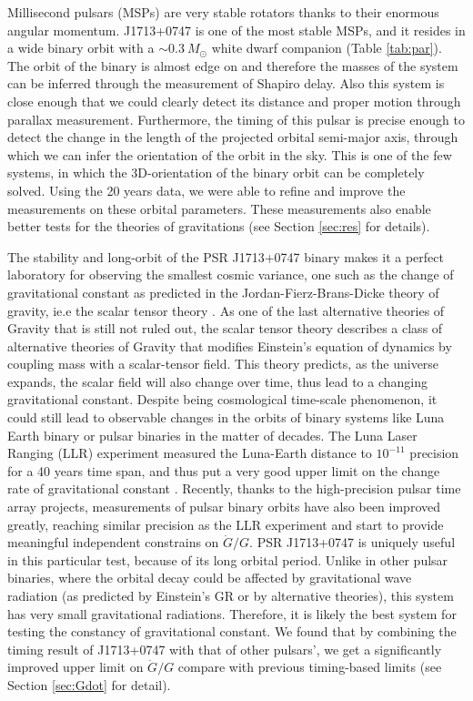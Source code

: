 Millisecond pulsars (MSPs) are very stable rotators thanks to their enormous angular momentum. J1713+0747 is one of
the most stable MSPs, and it resides in a wide binary orbit
with a $\sim0.3~M_{\odot}$ white dwarf companion (Table \ref{tab:par}). 
The orbit of the binary is almost edge on and therefore the masses of the system can be inferred through the measurement of Shapiro delay. 
Also this system is close enough that we could clearly detect its distance and proper motion through parallax measurement.
Furthermore, the timing of this pulsar is precise enough to detect the change in the length of the projected orbital semi-major axis, through which we can infer the orientation of the orbit in the sky.
This is one of the few systems, in which the 3D-orientation of the binary orbit can be completely solved. Using the 20 years data, we were able to refine and improve the measurements on these orbital parameters.
These measurements also enable better tests for the theories of gravitations (see Section \ref{sec:res} for details).


The stability and long-orbit of the PSR J1713+0747 binary makes it a
perfect laboratory for observing the smallest cosmic variance, one such as the
change of gravitational constant as predicted in the Jordan-Fierz-Brans-Dicke
theory of gravity, ie.e the scalar tensor theory \citep{jor59,fie56,bd61}. 
As one of the last alternative theories of Gravity that is still not
ruled out, the scalar tensor theory describes a class of alternative theories of Gravity
that modifies Einstein's equation of dynamics by coupling mass with a scalar-tensor field.
This theory predicts, as the universe expands, the scalar field will
also change over time, thus lead to a changing gravitational constant. Despite
being cosmological time-scale phenomenon, it could still lead to observable 
changes in the orbits of binary systems like Luna Earth binary or pulsar
binaries in the matter of decades. The Luna Laser Ranging (LLR) experiment measured the
Luna-Earth distance to $10^{-11}$ precision for a 40 years time span, and thus put a very good upper limit on the change rate of gravitational constant
\citep{hmb10}. Recently, thanks to the high-precision pulsar time array
projects, measurements of pulsar binary orbits have also been improved
greatly, reaching similar precision as the LLR experiment and start to provide
meaningful independent constrains on $\dot{G}/G$. PSR J1713+0747 is uniquely
useful in this particular test, because of its long orbital period. Unlike in
other pulsar binaries, where the orbital decay could be affected by
gravitational wave radiation (as predicted by Einstein's GR or by 
alternative theories), this system has very small gravitational radiations. 
Therefore, it is likely the best system for testing the constancy of
gravitational constant. We found that by combining the timing result of
J1713+0747 with that of other pulsars', we get a significantly 
improved upper limit on $\dot{G}/G$ compare with previous timing-based 
limits (see Section \ref{sec:Gdot} for detail).

